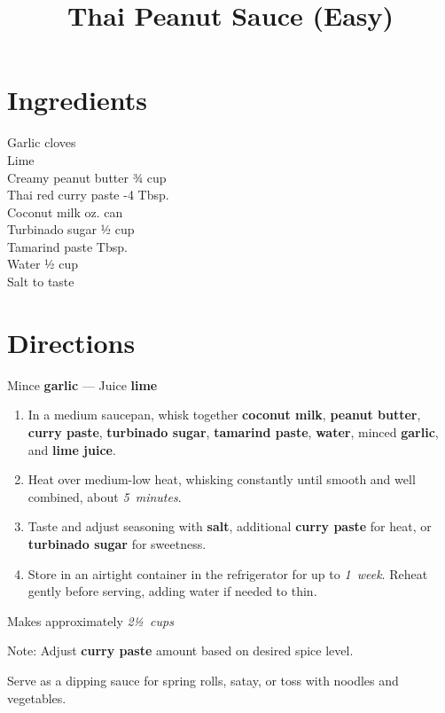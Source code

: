 \documentclass[11pt,letterpaper]{article}
\title{Thai Peanut Sauce (Easy)}
\author{}
\date{}
\begin{document}
\maketitle
\thispagestyle{empty}

\section*{Ingredients}
\setlength{\columnsep}{20pt}
\begin{multicols}{2}
\noindent
    Garlic cloves  \\
    Lime  \\
    Creamy peanut butter \dotfill ¾ cup \\
    Thai red curry paste -4 Tbsp. \\
    \columnbreak
    Coconut milk  oz. can \\
    Turbinado sugar \dotfill ½ cup \\
    Tamarind paste  Tbsp. \\
    Water \dotfill ½ cup \\
    Salt \dotfill to taste \\
\end{multicols}

\section*{Directions}

\noindent
Mince \textbf{garlic} ---
Juice \textbf{lime}

\begin{enumerate}
    \item In a medium saucepan, whisk together \textbf{coconut milk}, \textbf{peanut butter}, \textbf{curry paste}, \textbf{turbinado sugar}, \textbf{tamarind paste}, \textbf{water}, minced \textbf{garlic}, and \textbf{lime juice}.
    
    \item Heat over medium-low heat, whisking constantly until smooth and well combined, about \textit{5~minutes}.
    
    \item Taste and adjust seasoning with \textbf{salt}, additional \textbf{curry paste} for heat, or \textbf{turbinado sugar} for sweetness.
    
    \item Store in an airtight container in the refrigerator for up to \textit{1~week}. Reheat gently before serving, adding water if needed to thin.
\end{enumerate}

Makes approximately \textit{2½~cups}

Note: Adjust \textbf{curry paste} amount based on desired spice level.

Serve as a dipping sauce for spring rolls, satay, or toss with noodles and vegetables.
\end{document}
